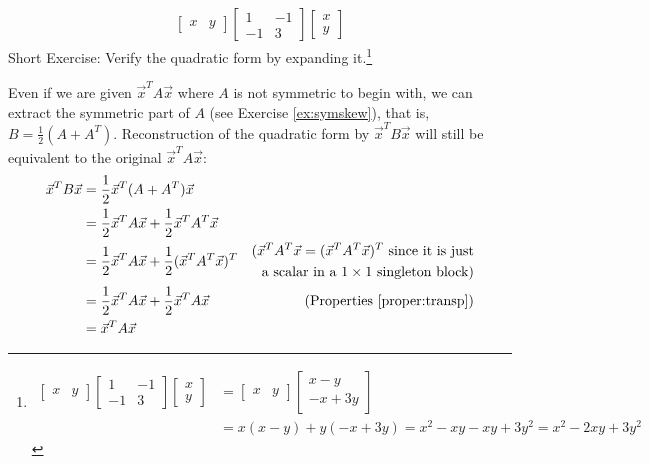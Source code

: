 \begin{align*}
\begin{bmatrix}
x & y
\end{bmatrix}
\begin{bmatrix}
1 & -1 \\
-1 & 3
\end{bmatrix}
\begin{bmatrix}
x \\
y
\end{bmatrix}
\end{align*}
Short Exercise: Verify the quadratic form by expanding it.\footnote{\begin{align*}
\begin{bmatrix}
x & y
\end{bmatrix}
\begin{bmatrix}
1 & -1 \\
-1 & 3
\end{bmatrix}
\begin{bmatrix}
x \\
y
\end{bmatrix} 
&= 
\begin{bmatrix}
x & y
\end{bmatrix}
\begin{bmatrix}
x - y \\
-x + 3y
\end{bmatrix} \\
&= x(x-y) + y(-x+3y) = x^2 - xy - xy + 3y^2 = x^2 - 2xy + 3y^2
\end{align*}} \par
Even if we are given $\vec{x}^TA\vec{x}$ where $A$ is not symmetric to begin with, we can extract the symmetric part of $A$ (see Exercise \ref{ex:symskew}), that is, $B = \frac{1}{2}(A + A^T)$. Reconstruction of the quadratic form by $\vec{x}^TB\vec{x}$ will still be equivalent to the original $\vec{x}^TA\vec{x}$:
\begin{align*}
\vec{x}^TB\vec{x} &= \frac{1}{2}\vec{x}^T(A + A^T)\vec{x} \\
&= \frac{1}{2}\vec{x}^TA\vec{x} + \frac{1}{2}\vec{x}^TA^T\vec{x} \\
&= \frac{1}{2}\vec{x}^TA\vec{x} + \frac{1}{2}(\vec{x}^TA^T\vec{x})^T & \begin{aligned}
\text{($\vec{x}^TA^T\vec{x} = (\vec{x}^TA^T\vec{x})^T$ since it is just} \\
\text{a scalar in a $1 \times 1$ singleton block)}  
\end{aligned} \\
&= \frac{1}{2}\vec{x}^TA\vec{x} + \frac{1}{2}\vec{x}^TA\vec{x} & \text{(Properties \ref{proper:transp})} \\
&= \vec{x}^TA\vec{x}
\end{align*}
